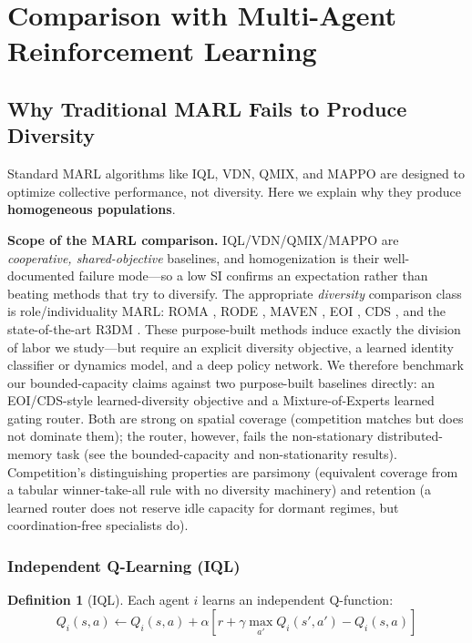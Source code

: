 \documentclass[11pt,a4paper]{article}
\theoremstyle{definition}
\newtheorem{definition}{Definition}[section]
\theoremstyle{plain}
\begin{document}
\section{Comparison with Multi-Agent Reinforcement Learning}

\subsection{Why Traditional MARL Fails to Produce Diversity}

Standard MARL algorithms like IQL, VDN, QMIX, and MAPPO are designed to optimize collective performance, not diversity. Here we explain why they produce \textbf{homogeneous populations}.

\begin{keypoint}
\textbf{Scope of the MARL comparison.} IQL/VDN/QMIX/MAPPO are \emph{cooperative,
shared-objective} baselines, and homogenization is their well-documented failure
mode---so a low SI confirms an expectation rather than beating methods that try to
diversify. The appropriate \emph{diversity} comparison class is role/individuality
MARL: ROMA \cite{wang2020roma}, RODE \cite{wang2021rode}, MAVEN
\cite{mahajan2019maven}, EOI \cite{jiang2021eoi}, CDS \cite{li2021cds}, and the
state-of-the-art R3DM \cite{goel2025r3dm}. These purpose-built methods induce
exactly the division of labor we study---but require an explicit diversity
objective, a learned identity classifier or dynamics model, and a deep policy
network. We therefore benchmark our bounded-capacity claims against two purpose-built
baselines directly: an EOI/CDS-style learned-diversity objective and a
Mixture-of-Experts learned gating router. Both are strong on spatial coverage
(competition matches but does not dominate them); the router, however, fails the
non-stationary distributed-memory task (see the bounded-capacity and
non-stationarity results). Competition's distinguishing properties are parsimony
(equivalent coverage from a tabular winner-take-all rule with no diversity
machinery) and retention (a learned router does not reserve idle capacity for
dormant regimes, but coordination-free specialists do).
\end{keypoint}

\subsubsection{Independent Q-Learning (IQL)}

\begin{definition}[IQL]
Each agent $i$ learns an independent Q-function:
\begin{equation}
Q_i(s, a) \leftarrow Q_i(s, a) + \alpha [r + \gamma \max_{a'} Q_i(s', a') - Q_i(s, a)]
\end{equation}
\end{definition}
\end{document}
